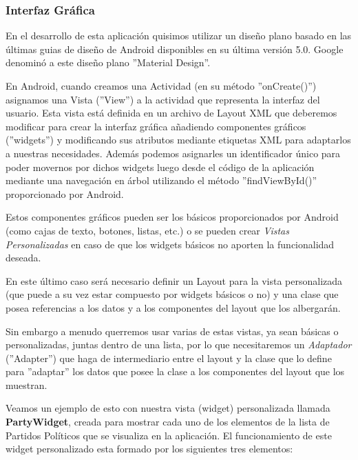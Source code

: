 	\subsubsection{Interfaz Gráfica}
	
		En el desarrollo de esta aplicación quisimos utilizar un diseño plano basado en las últimas guias de diseño de Android disponibles en su última versión 5.0. Google denominó a este diseño plano ''Material Design''. 
	
		En Android, cuando creamos una Actividad (en su método ''onCreate()'') asignamos una Vista (''View'') a la actividad que representa la interfaz del usuario. Esta vista está definida en un archivo de Layout XML que deberemos modificar para crear la interfaz gráfica añadiendo componentes gráficos \cite{ref:android_widget} (''widgets'') y modificando sus atributos mediante etiquetas XML para adaptarlos a nuestras necesidades. Además podemos asignarles un identificador único para poder movernos por dichos widgets luego desde el código de la aplicación mediante una navegación en árbol utilizando el método ''findViewById()'' proporcionado por Android. 
		
		Estos componentes gráficos pueden ser los básicos proporcionados por Android (como cajas de texto, botones, listas, etc.) o se pueden crear \textit{Vistas Personalizadas} en caso de que los widgets básicos no aporten la funcionalidad deseada.
		
		En este último caso será necesario definir un Layout para la vista personalizada (que puede a su vez estar compuesto por widgets básicos o no) y una clase que posea referencias a los datos y a los componentes del layout que los albergarán.
		
		Sin embargo a menudo querremos usar varias de estas vistas, ya sean básicas o personalizadas, juntas dentro de una lista,  por lo que necesitaremos un \textit{Adaptador}\cite{ref:android_adapter} (''Adapter'') que haga de intermediario entre el layout y la clase que lo define para ''adaptar'' los datos que posee la clase a los componentes del layout que los muestran. 
		
		Veamos un ejemplo de esto con nuestra vista (widget) personalizada llamada \textbf{PartyWidget}, creada para mostrar cada uno de los elementos de la lista de Partidos Políticos que se visualiza en la aplicación. El funcionamiento de este widget personalizado esta formado por los siguientes tres elementos:
		
